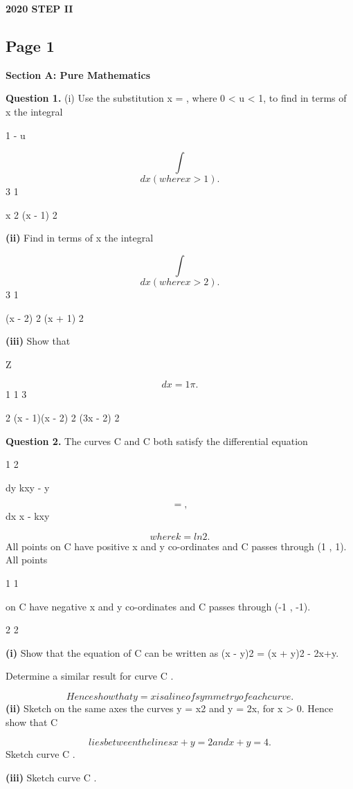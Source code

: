 \documentclass[12pt]{article}
\begin{document}
\begin{center}
{\Large \textbf{2020 STEP II}}
\end{center}

\subsection*{Page 1}
\begin{flushleft}
\bigskip\textbf{Section A: Pure Mathematics}\par
\bigskip\textbf{Question 1.} (i) Use the substitution x = , where 0 < u < 1, to find in terms of x the integral\par
1 - u\par
\[\int\]
\[dx (where x > 1).\]
3 1\par
x 2 (x - 1) 2\par
\textbf{(ii)} Find in terms of x the integral\par
\[\int\]
\[dx (where x > 2).\]
3 1\par
(x - 2) 2 (x + 1) 2\par
\textbf{(iii)} Show that\par
Z \par
\[dx = 1 \pi.\]
1 1 3\par
2 (x - 1)(x - 2) 2 (3x - 2) 2\par
\bigskip\textbf{Question 2.} The curves C and C both satisfy the differential equation\par
1 2\par
dy kxy - y\par
\[= ,\]
dx x - kxy\par
\[where k = ln 2.\]
All points on C have positive x and y co-ordinates and C passes through (1 , 1). All points\par
1 1\par
on C have negative x and y co-ordinates and C passes through (-1 , -1).\par
2 2\par
\textbf{(i)} Show that the equation of C can be written as (x - y)2 = (x + y)2 - 2x+y.\par
Determine a similar result for curve C .\par
\[Hence show that y = x is a line of symmetry of each curve.\]
\textbf{(ii)} Sketch on the same axes the curves y = x2 and y = 2x, for x > 0. Hence show that C\par
\[lies between the lines x + y = 2 and x + y = 4.\]
Sketch curve C .\par
\textbf{(iii)} Sketch curve C .\par
\end{flushleft}
\end{document}
